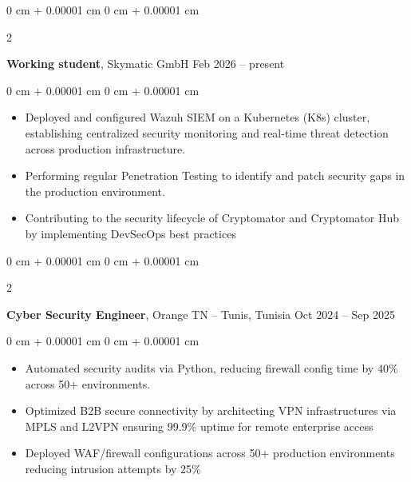 \documentclass[10pt, letterpaper]{article}
\newenvironment{highlights}{
    \begin{itemize}[
        topsep=0.10 cm,
        parsep=0.10 cm,
        partopsep=0pt,
        itemsep=0pt,
        leftmargin=0 cm + 10pt
    ]
}{
    \end{itemize}
} %
\newenvironment{onecolentry}{
    \begin{adjustwidth}{
        0 cm + 0.00001 cm
    }{
        0 cm + 0.00001 cm
    }
}{
    \end{adjustwidth}
} %
\newenvironment{twocolentry}[2][]{
    \onecolentry
    \def\secondColumn{#2}
    \setcolumnwidth{\fill, 4.5 cm}
    \begin{paracol}{2}
}{
    \switchcolumn \raggedleft \secondColumn
    \end{paracol}
    \endonecolentry
} %
\begin{document}
        
        \begin{twocolentry}{
            Feb 2026 – present
        }
            \textbf{Working student}, Skymatic GmbH \end{twocolentry}

        \vspace{0.10 cm}
        \begin{onecolentry}
            \begin{highlights}
                \item Deployed and configured Wazuh SIEM on a Kubernetes (K8s) cluster, establishing centralized security monitoring and real-time threat detection across production infrastructure.
                \item Performing regular Penetration Testing to identify and patch security gaps in the production environment.
                \item Contributing to the security lifecycle of Cryptomator and Cryptomator Hub by implementing DevSecOps best practices
            \end{highlights}
        \end{onecolentry}

        \vspace{0.2 cm}


        \begin{twocolentry}{
            Oct 2024 – Sep 2025
        }
            \textbf{Cyber Security Engineer}, Orange TN -- Tunis, Tunisia\end{twocolentry}

        \vspace{0.10 cm}
        \begin{onecolentry}
            \begin{highlights}
                \item Automated security audits via Python, reducing firewall config time by 40\% across 50+ environments.
                \item Optimized B2B secure connectivity by architecting VPN infrastructures via MPLS and L2VPN ensuring 99.9\% uptime for remote enterprise access
                \item Deployed WAF/firewall configurations across 50+ production environments reducing intrusion attempts by 25\%
            \end{highlights}
        \end{onecolentry}
\end{document}
